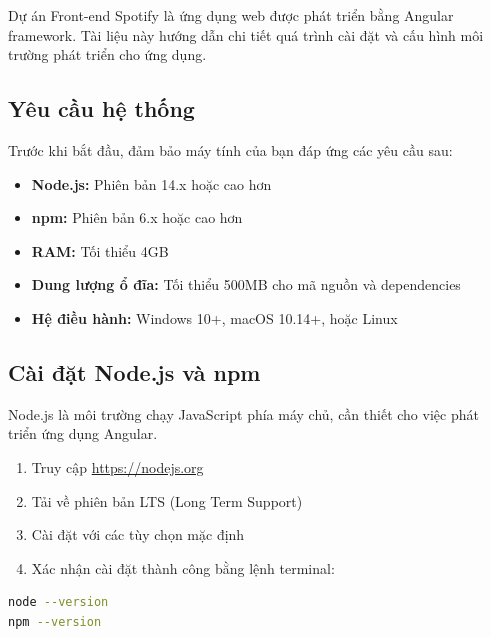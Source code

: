 Dự án Front-end Spotify là ứng dụng web được phát triển bằng Angular framework. Tài liệu này hướng dẫn chi tiết quá trình cài đặt và cấu hình môi trường phát triển cho ứng dụng.

\subsection{Yêu cầu hệ thống}

Trước khi bắt đầu, đảm bảo máy tính của bạn đáp ứng các yêu cầu sau:

\begin{tcolorbox}[colback=blue!5,colframe=blue!40!black,title=Yêu cầu cấu hình]
\begin{itemize}
  \item \textbf{Node.js:} Phiên bản 14.x hoặc cao hơn
  \item \textbf{npm:} Phiên bản 6.x hoặc cao hơn
  \item \textbf{RAM:} Tối thiểu 4GB
  \item \textbf{Dung lượng ổ đĩa:} Tối thiểu 500MB cho mã nguồn và dependencies
  \item \textbf{Hệ điều hành:} Windows 10+, macOS 10.14+, hoặc Linux
\end{itemize}
\end{tcolorbox}

\subsection{Cài đặt Node.js và npm}

Node.js là môi trường chạy JavaScript phía máy chủ, cần thiết cho việc phát triển ứng dụng Angular.


\begin{enumerate}
  \item Truy cập \url{https://nodejs.org}
  \item Tải về phiên bản LTS (Long Term Support)
  \item Cài đặt với các tùy chọn mặc định
  \item Xác nhận cài đặt thành công bằng lệnh terminal:
\end{enumerate}

\begin{lstlisting}[language=bash]
node --version
npm --version
\end{lstlisting}

